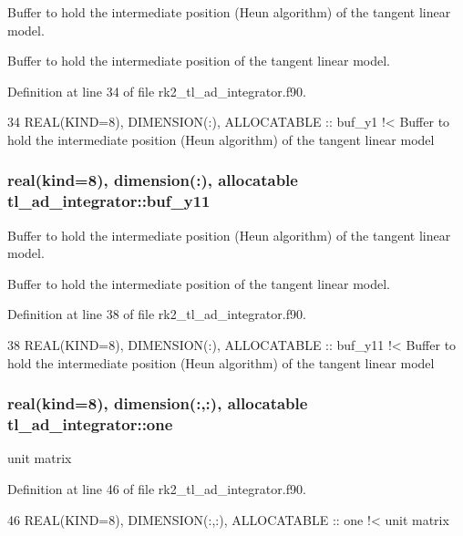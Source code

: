 Buffer to hold the intermediate position (Heun algorithm) of the tangent linear model. 

Buffer to hold the intermediate position of the tangent linear model. 

Definition at line 34 of file rk2\+\_\+tl\+\_\+ad\+\_\+integrator.\+f90.


\begin{DoxyCode}
34   \textcolor{keywordtype}{REAL(KIND=8)}, \textcolor{keywordtype}{DIMENSION(:)}, \textcolor{keywordtype}{ALLOCATABLE} :: buf\_y1\textcolor{comment}{ !< Buffer to hold the intermediate position (Heun
       algorithm) of the tangent linear model}
\end{DoxyCode}
\subsubsection[{\texorpdfstring{buf\+\_\+y11}{buf_y11}}]{\setlength{\rightskip}{0pt plus 5cm}real(kind=8), dimension(\+:), allocatable tl\+\_\+ad\+\_\+integrator\+::buf\+\_\+y11\hspace{0.3cm}{\ttfamily [private]}}\hypertarget{namespacetl__ad__integrator_ae17c25e2843c5f18b69c133ccca1d483}{}\label{namespacetl__ad__integrator_ae17c25e2843c5f18b69c133ccca1d483}


Buffer to hold the intermediate position (Heun algorithm) of the tangent linear model. 

Buffer to hold the intermediate position of the tangent linear model. 

Definition at line 38 of file rk2\+\_\+tl\+\_\+ad\+\_\+integrator.\+f90.


\begin{DoxyCode}
38   \textcolor{keywordtype}{REAL(KIND=8)}, \textcolor{keywordtype}{DIMENSION(:)}, \textcolor{keywordtype}{ALLOCATABLE} :: buf\_y11\textcolor{comment}{ !< Buffer to hold the intermediate position (Heun
       algorithm) of the tangent linear model}
\end{DoxyCode}
\subsubsection[{\texorpdfstring{one}{one}}]{\setlength{\rightskip}{0pt plus 5cm}real(kind=8), dimension(\+:,\+:), allocatable tl\+\_\+ad\+\_\+integrator\+::one\hspace{0.3cm}{\ttfamily [private]}}\hypertarget{namespacetl__ad__integrator_a08f375467a942d0ad466b407a8007a7e}{}\label{namespacetl__ad__integrator_a08f375467a942d0ad466b407a8007a7e}


unit matrix 



Definition at line 46 of file rk2\+\_\+tl\+\_\+ad\+\_\+integrator.\+f90.


\begin{DoxyCode}
46   \textcolor{keywordtype}{REAL(KIND=8)}, \textcolor{keywordtype}{DIMENSION(:,:)}, \textcolor{keywordtype}{ALLOCATABLE} :: one\textcolor{comment}{        !< unit matrix }
\end{DoxyCode}
